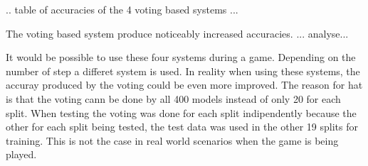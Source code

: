 .. table of accuracies of the 4 voting based systems ...

The voting based system produce noticeably increased accuracies. ... analyse... 


It would be possible to use these four systems during a game. Depending on the number of step a differet system is used. In reality when using these systems, the accuray produced by the voting could be even more improved. The reason for hat is that the voting cann be done by all 400 models instead of only 20 for each split. When testing the voting was done for each split indipendently because the other for each split being tested, the test data was used in the other 19 splits for training. This is not the case in real world scenarios when the game is being played. 